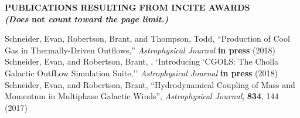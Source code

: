 \documentclass[11pt,letterpaper,english]{article}
\begin{document}
\setlength{\parindent}{0in} %


\pagestyle{fancy}   \renewcommand{%
\headrulewidth}{0.0pt}

\begin{center}
\bf {PUBLICATIONS RESULTING FROM INCITE AWARDS} \\
{\bf {\em (Does} not {\em count toward the page limit.)}}
\end{center}
\vspace{-.25in}



\leftskip 0.25in
\parindent -0.25in
{Schneider, Evan, Robertson, Brant, and Thompson, Todd, ``Production of Cool Gas in Thermally-Driven Outflows,'' {\em Astrophysical Journal} {\bf in press} (2018)}\\
{Schneider, Evan, and Robertson, Brant, , `Introducing `CGOLS: The Cholla Galactic OutfLow Simulation Suite,'' {\em Astrophysical Journal}  {\bf in press} (2018) } \\
{Schneider, Evan, and Robertson, Brant, ``Hydrodynamical Coupling of Mass and Momentum in Multiphase Galactic Winds'', {\em Astrophysical Journal}, {\bf 834}, 144 (2017)} \\
\end{document}

